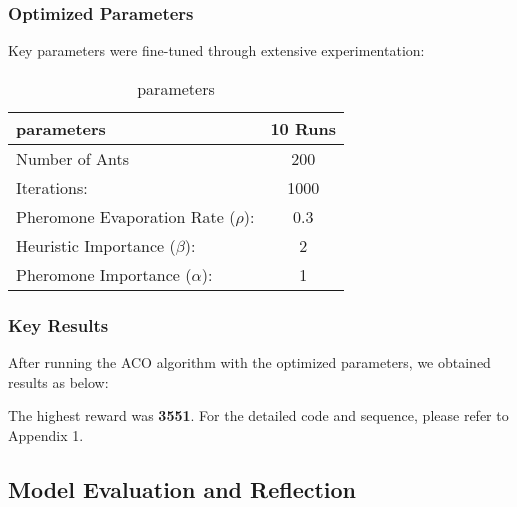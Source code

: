 \documentclass[twocolumn, a4paper]{article}
\begin{document}


\subsubsection{Optimized Parameters}
Key parameters were fine-tuned through extensive experimentation:
\begin{table}[htbp]
  \centering
  \setlength{\tabcolsep}{4pt}
  \caption{parameters}
\begin{tabular}{@{}lc@{}}
    \toprule
    \textbf{parameters}   & \textbf{10 Runs} \\
    \midrule
Number of Ants            &200\\
Iterations:                 &1000\\
Pheromone Evaporation Rate ($\rho$): &0.3\\
Heuristic Importance ($\beta$):    &2\\
Pheromone Importance ($\alpha$): &1 \\
    \bottomrule
  \end{tabular}
\label{tab:reliability}
\end{table}

\subsubsection{Key Results}
After running the ACO algorithm with the optimized parameters, we obtained results as below:

The highest reward was \textbf{3551}. For the detailed code and sequence, please refer to Appendix 1.

\subsection{Model Evaluation and Reflection}
\end{document}
